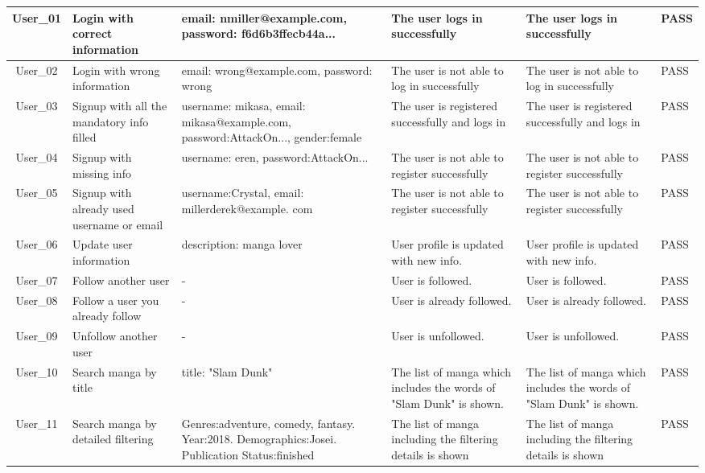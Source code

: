 \begin{longtable}{|c|>{\RaggedRight}p{2cm}|>{\RaggedRight}p{3.5cm}|>{\RaggedRight}p{3cm}|>{\RaggedRight}p{3cm}|>{\RaggedRight}p{1.5 cm}|}
    User\_01 & Login with correct information & email: nmiller@example.com, password: f6d6b3ffecb44a... & The user logs in successfully & The user logs in successfully  & PASS \\
    \hline
    User\_02 & Login with wrong information  & email: wrong@example.com, password: wrong  & The user is not able to log in successfully & The user is not able to log in successfully  & PASS  \\
    \hline
    User\_03  & Signup with all the mandatory info filled & username: mikasa, email: mikasa@example.com, password:AttackOn..., gender:female  & The user is registered successfully and logs in  & The user is registered successfully and logs in  & PASS  \\
    \hline
    User\_04  & Signup with missing info & username: eren, password:AttackOn...  & The user is not able to register successfully  & The user is not able to register successfully  & PASS  \\
    \hline
    User\_05 & Signup with already used username or email & username:Crystal, email: millerderek@example. com & The user is not able to register successfully & The user is not able to register successfully & PASS \\
    \hline
    User\_06 & Update user information & description: manga lover & User profile is updated with new info.  & User profile is updated with new info.  & PASS  \\
    \hline
    User\_07 & Follow another user & - & User is followed.  & User is followed.  & PASS  \\
    \hline
    User\_08 & Follow a user you already follow & - & User is already followed.  & User is already followed.  & PASS  \\
    \hline
    User\_09 & Unfollow another user & - & User is unfollowed. & User is unfollowed.  & PASS  \\
    \hline
    User\_10 & Search manga by title & title: "Slam Dunk"  & The list of manga which includes the words of "Slam Dunk" is shown.  & The list of manga which includes the words of "Slam Dunk" is shown. & PASS  \\
    \hline
    User\_11 & Search manga by detailed filtering & Genres:adventure, comedy, fantasy. Year:2018. Demographics:Josei. Publication Status:finished  & The list of manga including the filtering details is shown  & The list of manga including the filtering details is shown  & PASS  \\

\end{longtable}
